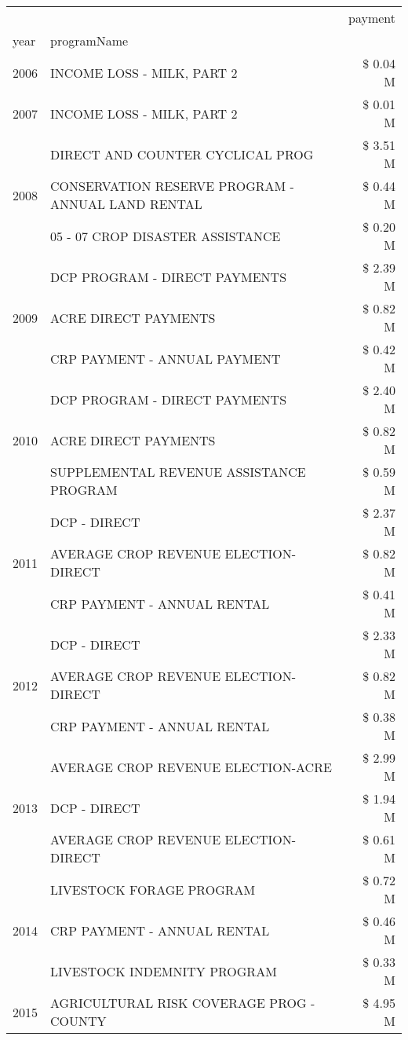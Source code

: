 \begin{tabular}{llr}
\toprule
 &  & payment \\
year & programName &  \\
\midrule
2006 & INCOME LOSS - MILK, PART 2 & \$ 0.04 M \\
\cline{1-3}
2007 & INCOME LOSS - MILK, PART 2 & \$ 0.01 M \\
\cline{1-3}
\multirow[t]{3}{*}{2008} & DIRECT AND COUNTER CYCLICAL PROG & \$ 3.51 M \\
 & CONSERVATION RESERVE PROGRAM - ANNUAL LAND RENTAL & \$ 0.44 M \\
 & 05 - 07 CROP DISASTER ASSISTANCE & \$ 0.20 M \\
\cline{1-3}
\multirow[t]{3}{*}{2009} & DCP PROGRAM - DIRECT PAYMENTS & \$ 2.39 M \\
 & ACRE DIRECT PAYMENTS & \$ 0.82 M \\
 & CRP PAYMENT - ANNUAL PAYMENT & \$ 0.42 M \\
\cline{1-3}
\multirow[t]{3}{*}{2010} & DCP PROGRAM - DIRECT PAYMENTS & \$ 2.40 M \\
 & ACRE DIRECT PAYMENTS & \$ 0.82 M \\
 & SUPPLEMENTAL REVENUE ASSISTANCE PROGRAM & \$ 0.59 M \\
\cline{1-3}
\multirow[t]{3}{*}{2011} & DCP - DIRECT & \$ 2.37 M \\
 & AVERAGE CROP REVENUE ELECTION-DIRECT & \$ 0.82 M \\
 & CRP PAYMENT - ANNUAL RENTAL & \$ 0.41 M \\
\cline{1-3}
\multirow[t]{3}{*}{2012} & DCP - DIRECT & \$ 2.33 M \\
 & AVERAGE CROP REVENUE ELECTION-DIRECT & \$ 0.82 M \\
 & CRP PAYMENT - ANNUAL RENTAL & \$ 0.38 M \\
\cline{1-3}
\multirow[t]{3}{*}{2013} & AVERAGE CROP REVENUE ELECTION-ACRE & \$ 2.99 M \\
 & DCP - DIRECT & \$ 1.94 M \\
 & AVERAGE CROP REVENUE ELECTION-DIRECT & \$ 0.61 M \\
\cline{1-3}
\multirow[t]{3}{*}{2014} & LIVESTOCK FORAGE PROGRAM & \$ 0.72 M \\
 & CRP PAYMENT - ANNUAL RENTAL & \$ 0.46 M \\
 & LIVESTOCK INDEMNITY PROGRAM & \$ 0.33 M \\
\cline{1-3}
\multirow[t]{3}{*}{2015} & AGRICULTURAL RISK COVERAGE PROG - COUNTY & \$ 4.95 M \\

\end{tabular}
